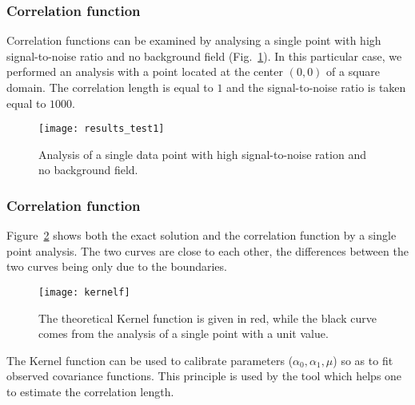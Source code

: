 \begin{frame}
\frametitle{Correlation function}

Correlation functions can be examined by analysing a single point with high signal-to-noise ratio and no background field (Fig.~\ref{singleanalysis}). In this particular case, we performed an analysis with a point located at the center $(0,0)$ of a square domain. The correlation length is equal to $1$ and the signal-to-noise ratio is taken equal to $1000$.

\begin{figure}[htpb]
	\centering
	\parbox{.6\textwidth}{
		\texttt{[image: results\_test1]}
		}\parbox{.4\textwidth}{
		\caption{Analysis of a single data point with high signal-to-noise ration and no background field.\label{singleanalysis}}}
\end{figure}

\end{frame}


\begin{frame}
\frametitle{Correlation function}

Figure~\ref{kernel1} shows both the exact solution and the correlation function by a single point analysis. The two curves are close to each other, the differences between the two curves being only due to the boundaries.

\begin{figure}[htpb]
	\centering
	\parbox{.6\textwidth}{
		\texttt{[image: kernelf]}
		}\parbox{.4\textwidth}{
		\caption[Theoretical Kernel function and analysis of a single point with a unit value.]{The theoretical Kernel function is given in red, while the black curve comes from the analysis of a single point with a unit value.\label{kernel1}}}
\end{figure}

The Kernel function can be used to calibrate \diva parameters ($\alpha_0, \alpha_1, \mu$) so as to fit observed covariance functions. This principle is used by the tool  which helps one to estimate the correlation length.

\end{frame}



